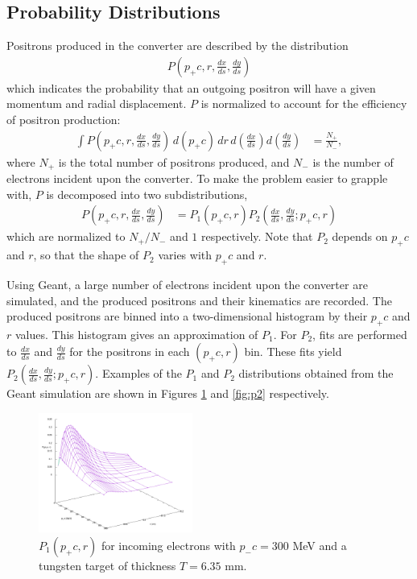 \documentclass[letter,
               biblatex,     %
               keeplastbox,   %
               ]{jacow}
\newcommand{\dxds}{\frac{dx}{ds}}
\newcommand{\dyds}{\frac{dy}{ds}}
\begin{document}
\subsection{Probability Distributions}

Positrons produced in the converter are described by the distribution
\begin{align}
P \left( p_+ c, r, \dxds, \dyds \right)
\end{align}
which indicates the probability that an outgoing positron will have a given momentum and radial displacement.
$P$ is normalized to account for the efficiency of positron production:
\begin{align}
\int P \left( p_+ c, r, \dxds, \dyds \right) \, d(p_+ c) \, dr \, d \! \left( \dxds \right) d \! \left( \dyds \right) & = \frac{N_+}{N_-},
\end{align}
where $N_+$ is the total number of positrons produced, and $N_-$ is the number of electrons incident upon the converter.
To make the problem easier to grapple with, $P$ is decomposed into two subdistributions,
\begin{align}
P \left( p_+ c, r, \dxds, \dyds \right) & = P_1 \left( p_+ c, r \right) P_2 \left( \dxds, \dyds ; p_+ c, r \right)
\end{align}
which are normalized to $N_+/N_-$ and $1$ respectively.
Note that $P_2$ depends on $p_+ c$ and $r$, so that the shape of $P_2$ varies with $p_+ c$ and $r$.

Using Geant\cite{geant}, a large number of electrons incident upon the converter are simulated, and the produced positrons and their kinematics are recorded.
The produced positrons are binned into a two-dimensional histogram by their $p_+ c$ and $r$ values.
This histogram gives an approximation of $P_1$.
For $P_2$, fits are performed to $\dxds$ and $\dyds$ for the positrons in each $(p_+c, r)$ bin.
These fits yield $P_2 \left( \dxds, \dyds ; p_+ c, r \right)$.
Examples of the $P_1$ and $P_2$ distributions obtained from the Geant simulation are shown in Figures \ref{fig:p1} and \ref{fig:p2} respectively.

\begin{figure}
\centering
\includegraphics[width=0.45\textwidth]{p1}
\caption{$P_1(p_+ c, r)$ for incoming electrons with $p_- c = 300$ MeV and a tungsten target of thickness $T = 6.35$ mm.}
\label{fig:p1}
\end{figure}
\end{document}
